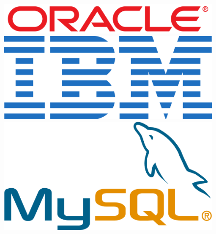 \documentclass[xcolor=dvipsnames]{beamer}
\begin{document}
\begin{frame}
\begin{figure}
\begin{center}
	\hspace{0.15cm}\includegraphics[scale=0.20]{oracle.png}
	\hspace{0.15cm}\includegraphics[scale=0.15]{ibm.png}\\[0.3cm]
	\includegraphics[scale=0.15]{mysql.png}

\end{center}
\end{figure}
\end{frame}
\end{document}
